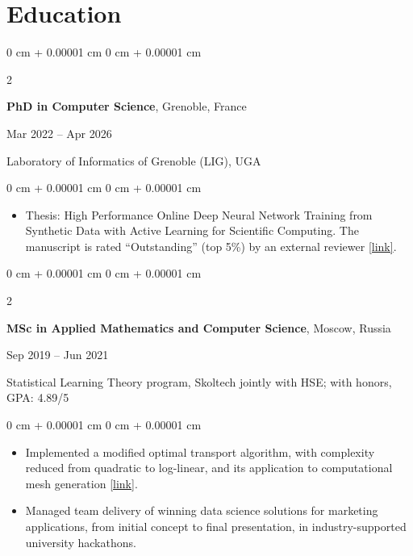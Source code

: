 \documentclass[10pt, letterpaper]{article}
\newenvironment{highlights}{
    \begin{itemize}[
        topsep=0.10 cm,
        parsep=0.10 cm,
        partopsep=0pt,
        itemsep=0pt,
        leftmargin=0 cm + 10pt
    ]
}{
    \end{itemize}
} %
\newenvironment{onecolentry}{
    \begin{adjustwidth}{
        0 cm + 0.00001 cm
    }{
        0 cm + 0.00001 cm
    }
}{
    \end{adjustwidth}
} %
\newenvironment{twocolentry}[2][]{
    \onecolentry
    \def\secondColumn{#2}
    \setcolumnwidth{\fill, 4.5 cm}
    \begin{paracol}{2}
}{
    \switchcolumn \raggedleft \secondColumn
    \end{paracol}
    \endonecolentry
} %
\let\hrefWithoutArrow\href
\begin{document}
    \section{Education}

        \begin{twocolentry}{Mar 2022 -- Apr 2026}
            \textbf{PhD in Computer Science}, Grenoble, France
        \end{twocolentry}
        Laboratory of Informatics of Grenoble (LIG), UGA
        \vspace{0.1 cm}
        \begin{onecolentry}
            \begin{highlights}
                \item Thesis: High Performance Online Deep Neural Network Training from Synthetic Data with Active Learning for Scientific Computing. The manuscript is rated ``Outstanding'' (top 5\%) by an external reviewer \href{https://svdcvt.github.io/phddefence/}{[link]}.
            \end{highlights}
        \end{onecolentry}
        \vspace{0.1 cm}

        \begin{twocolentry}{Sep 2019 -- Jun 2021}
            \textbf{MSc in Applied Mathematics and Computer Science}, Moscow, Russia
        \end{twocolentry}
        Statistical Learning Theory program, Skoltech jointly with HSE; with honors, GPA: 4.89/5
        \vspace{0.05 cm}
        \begin{onecolentry}
            \begin{highlights}
                \item Implemented a modified optimal transport algorithm, with complexity reduced from quadratic to log-linear, and its application to computational mesh generation
                 \hrefWithoutArrow{https://drive.google.com/drive/folders/17uK18UkpTXBUYaWh4q8fphDWdXxe_M9z?usp=drive_link}{[link]}.
                \item Managed team delivery of winning data science solutions for marketing applications, from initial concept to final presentation, in industry-supported university hackathons.
            \end{highlights}
        \end{onecolentry}

        \vspace{0.05 cm}
\end{document}
